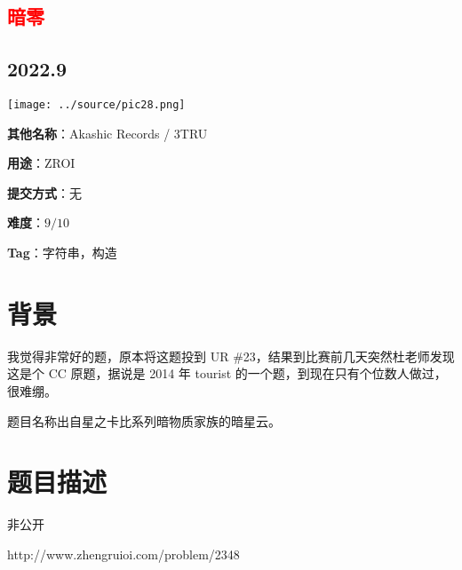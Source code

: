 \documentclass[a4paper,10pt]{article}
\begin{document}
\vspace*{\fill}
\begin{center}

\section{\textcolor{red}{暗零}}

\subsection*{2022.9}

\vspace{10pt}

\texttt{[image: ../source/pic28.png]}

\vspace{10pt}

\textbf{其他名称}：Akashic Records / 3TRU

\vspace{10pt}

\textbf{用途}：ZROI

\vspace{10pt}

\textbf{提交方式}：无

\vspace{10pt}

\textbf{难度}：$9/10$

\vspace{10pt}

\textbf{Tag}：字符串，构造

\end{center}
\vspace*{\fill}

\newpage

\section*{背景}

我觉得非常好的题，原本将这题投到 UR \#23，结果到比赛前几天突然杜老师发现这是个 CC 原题，据说是 2014 年 tourist 的一个题，到现在只有个位数人做过，很难绷。

题目名称出自星之卡比系列暗物质家族的暗星云。

\section*{题目描述}

非公开

http://www.zhengruioi.com/problem/2348
\end{document}
